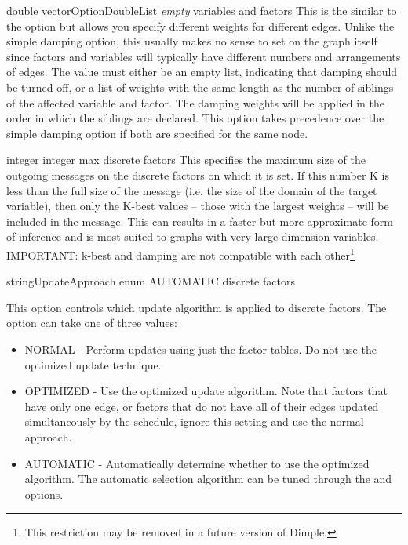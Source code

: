 
{\ifmatlab double vector\fi \ifjava OptionDoubleList\fi}
{\textit{empty}}
{variables and factors}
{This is the similar to the  option but allows you specify different weights for different edges. Unlike the simple damping option, this usually makes no sense to set on the graph itself since factors and variables will typically have different numbers and arrangements of edges. The value must either be an empty list, indicating that damping should be turned off, or a list of weights with the same length as the number of siblings of the affected variable and factor. The damping weights will be applied in the order in which the siblings are declared.
\linebreak
\linebreak
This option takes precedence over the simple damping option if both are specified for the same node.
}


{integer}
{integer max}
{discrete factors}
{This specifies the maximum size of the outgoing messages on the discrete factors on which it is set. If this number K is less than the full size of the message (i.e. the size of the domain of the target variable), then only the K-best values -- those with the largest weights -- will be included in the message. This can results in a faster but more approximate form of inference and is most suited to graphs with very large-dimension variables.
\linebreak
\linebreak
IMPORTANT: k-best and damping are not compatible with each other\footnote{This restriction may be removed in a future version of Dimple.}}


{\ifmatlab string\fi \ifjava UpdateApproach enum\fi}
{AUTOMATIC}
{discrete factors}
{This option controls which update algorithm is applied to discrete factors. The option can take one of three values:
\begin{itemize}
\item NORMAL - Perform updates using just the factor tables. Do not use the optimized update technique.
\item OPTIMIZED - Use the optimized update algorithm. Note that factors that have only one edge, or factors that do not have all of their edges updated simultaneously by the schedule, ignore this setting and use the normal approach.
\item AUTOMATIC - Automatically determine whether to use the optimized algorithm. The automatic selection algorithm can be tuned through the  and  options.
\end{itemize}
}

